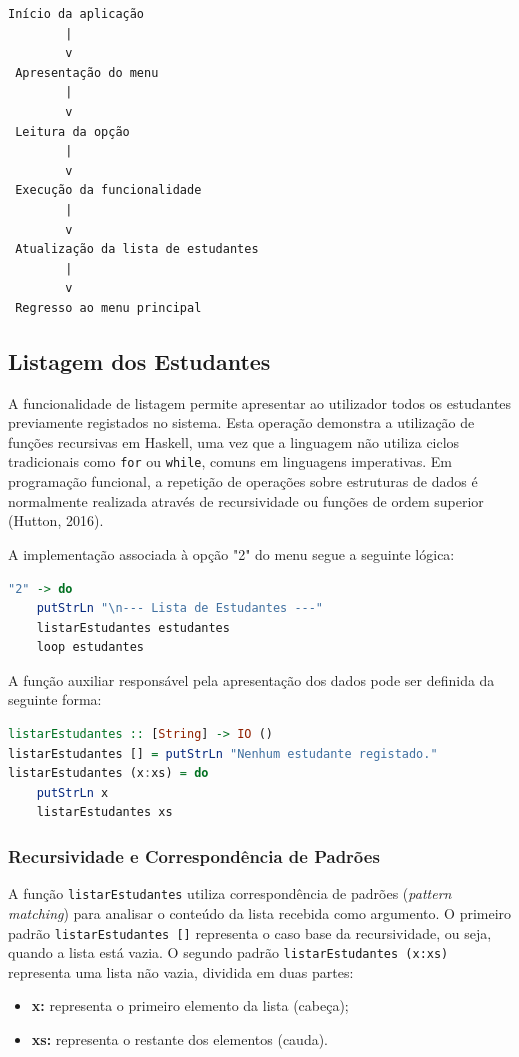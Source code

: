 \documentclass[12pt,a4paper]{article}
\begin{document}
\begin{verbatim}
Início da aplicação
        |
        v
 Apresentação do menu
        |
        v
 Leitura da opção
        |
        v
 Execução da funcionalidade
        |
        v
 Atualização da lista de estudantes
        |
        v
 Regresso ao menu principal
\end{verbatim}

\subsection{Listagem dos Estudantes}
A funcionalidade de listagem permite apresentar ao utilizador todos os estudantes previamente registados no sistema. Esta operação demonstra a utilização de funções recursivas em Haskell, uma vez que a linguagem não utiliza ciclos tradicionais como \texttt{for} ou \texttt{while}, comuns em linguagens imperativas. Em programação funcional, a repetição de operações sobre estruturas de dados é normalmente realizada através de recursividade ou funções de ordem superior (Hutton, 2016).

A implementação associada à opção "2" do menu segue a seguinte lógica:
\begin{lstlisting}[language=Haskell]
"2" -> do
    putStrLn "\n--- Lista de Estudantes ---"
    listarEstudantes estudantes
    loop estudantes
\end{lstlisting}

A função auxiliar responsável pela apresentação dos dados pode ser definida da seguinte forma:
\begin{lstlisting}[language=Haskell]
listarEstudantes :: [String] -> IO ()
listarEstudantes [] = putStrLn "Nenhum estudante registado."
listarEstudantes (x:xs) = do
    putStrLn x
    listarEstudantes xs
\end{lstlisting}

\subsubsection*{Recursividade e Correspondência de Padrões}
A função \texttt{listarEstudantes} utiliza correspondência de padrões (\textit{pattern matching}) para analisar o conteúdo da lista recebida como argumento.
O primeiro padrão \texttt{listarEstudantes []} representa o caso base da recursividade, ou seja, quando a lista está vazia. O segundo padrão \texttt{listarEstudantes (x:xs)} representa uma lista não vazia, dividida em duas partes:
\begin{itemize}
    \item \textbf{x:} representa o primeiro elemento da lista (cabeça);
    \item \textbf{xs:} representa o restante dos elementos (cauda).
\end{itemize}
\end{document}
